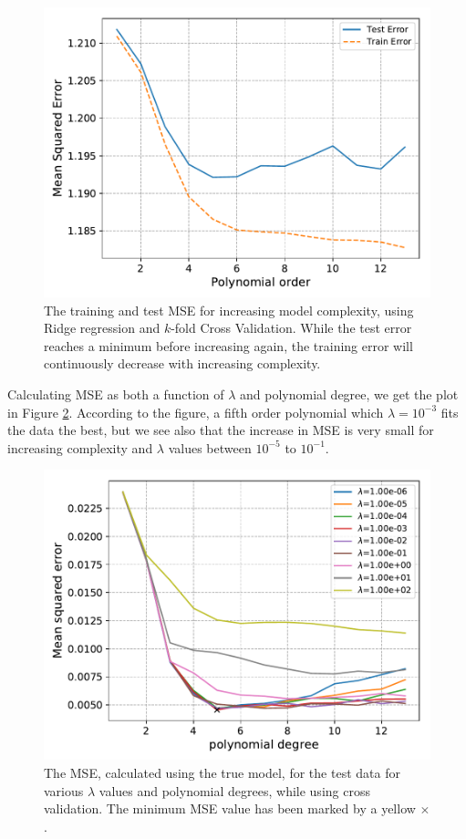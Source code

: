 \documentclass[a4paper,10pt,english]{article}
\begin{document}
\begin{figure}[H]
	\centering
	\includegraphics[scale=0.7]{d_Ridge_err_pdegree_noise.pdf}
	\caption{The training and test MSE for increasing model complexity, using Ridge regression and $k$-fold Cross Validation. While the test error reaches a minimum before increasing again, the training error will continuously decrease with increasing complexity.}
	\label{fig:4}
\end{figure}

Calculating MSE as both a function of $\lambda$ and polynomial degree, we get the plot in Figure \ref{fig:5}. According to the figure, a fifth order polynomial which $\lambda=10^{-3}$ fits the data the best, but we see also that the increase in MSE is very small for increasing complexity and $\lambda$ values between $10^{-5}$ to $10^{-1}$.

\begin{figure}[H]
	\centering
	\includegraphics[scale=0.6]{d_Ridge_MSE_pdegree_lmbda.pdf}
	\caption{The MSE, calculated using the true model, for the test data for various $\lambda$ values and polynomial degrees, while using cross validation. The minimum MSE value has been marked by a yellow $\times$.}
	\label{fig:5}
\end{figure}
\end{document}

